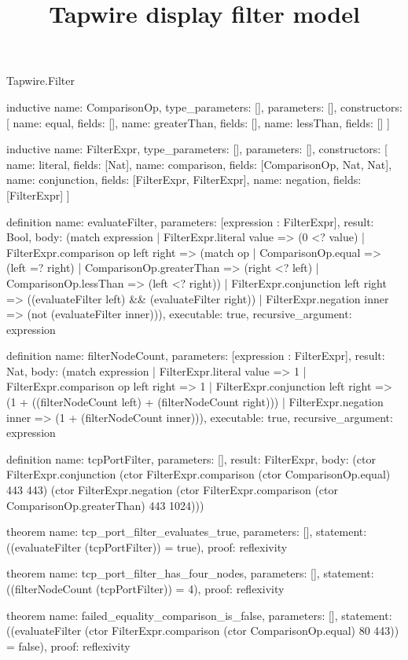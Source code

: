 \begin{lexlean}{Tapwire.Filter}
\title{Tapwire display filter model}
\begin{semanticmodule}
inductive{
  name: ComparisonOp,
  type_parameters: [],
  parameters: [],
  constructors: [
    {name: equal, fields: []},
    {name: greaterThan, fields: []},
    {name: lessThan, fields: []}
  ]
}

inductive{
  name: FilterExpr,
  type_parameters: [],
  parameters: [],
  constructors: [
    {name: literal, fields: [Nat]},
    {name: comparison, fields: [ComparisonOp, Nat, Nat]},
    {name: conjunction, fields: [FilterExpr, FilterExpr]},
    {name: negation, fields: [FilterExpr]}
  ]
}

definition{
  name: evaluateFilter,
  parameters: [expression : FilterExpr],
  result: Bool,
  body: (match expression
    | FilterExpr.literal value => (0 <? value)
    | FilterExpr.comparison op left right => (match op
      | ComparisonOp.equal => (left =? right)
      | ComparisonOp.greaterThan => (right <? left)
      | ComparisonOp.lessThan => (left <? right))
    | FilterExpr.conjunction left right => ((evaluateFilter left) && (evaluateFilter right))
    | FilterExpr.negation inner => (not (evaluateFilter inner))),
  executable: true,
  recursive_argument: expression
}

definition{
  name: filterNodeCount,
  parameters: [expression : FilterExpr],
  result: Nat,
  body: (match expression
    | FilterExpr.literal value => 1
    | FilterExpr.comparison op left right => 1
    | FilterExpr.conjunction left right => (1 + ((filterNodeCount left) + (filterNodeCount right)))
    | FilterExpr.negation inner => (1 + (filterNodeCount inner))),
  executable: true,
  recursive_argument: expression
}

definition{
  name: tcpPortFilter,
  parameters: [],
  result: FilterExpr,
  body: (ctor FilterExpr.conjunction (ctor FilterExpr.comparison (ctor ComparisonOp.equal) 443 443) (ctor FilterExpr.negation (ctor FilterExpr.comparison (ctor ComparisonOp.greaterThan) 443 1024)))
}

theorem{
  name: tcp_port_filter_evaluates_true,
  parameters: [],
  statement: ((evaluateFilter (tcpPortFilter)) = true),
  proof: reflexivity{}
}

theorem{
  name: tcp_port_filter_has_four_nodes,
  parameters: [],
  statement: ((filterNodeCount (tcpPortFilter)) = 4),
  proof: reflexivity{}
}

theorem{
  name: failed_equality_comparison_is_false,
  parameters: [],
  statement: ((evaluateFilter (ctor FilterExpr.comparison (ctor ComparisonOp.equal) 80 443)) = false),
  proof: reflexivity{}
}
\end{semanticmodule}
\end{lexlean}
